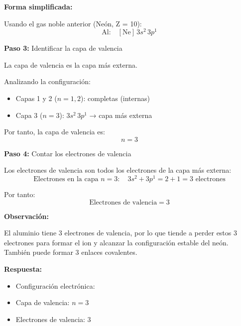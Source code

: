 \begin{exercise}
\begin{solu}
        \textbf{Forma simplificada:}

        Usando el gas noble anterior (Neón, Z = 10):
        \[
            \text{Al:} \quad [\text{Ne}] \, 3s^2 \, 3p^1
        \]

        \textbf{Paso 3:} Identificar la capa de valencia

        La capa de valencia es la capa más externa.

        Analizando la configuración:
        \begin{itemize}
            \item Capas 1 y 2 (\(n = 1, 2\)): completas (internas)
            \item Capa 3 (\(n = 3\)): \(3s^2 \, 3p^1\) → capa más externa
        \end{itemize}

        Por tanto, la capa de valencia es:
        \[
            \boxed{n = 3}
        \]

        \textbf{Paso 4:} Contar los electrones de valencia

        Los electrones de valencia son todos los electrones de la capa más externa:
        \[
            \text{Electrones en la capa } n = 3: \quad 3s^2 + 3p^1 = 2 + 1 = 3 \text{ electrones}
        \]

        Por tanto:
        \[
            \boxed{\text{Electrones de valencia} = 3}
        \]

        \textbf{Observación:}

        El aluminio tiene 3 electrones de valencia, por lo que tiende a perder estos 3 electrones para formar el ion  y alcanzar la configuración estable del neón. También puede formar 3 enlaces covalentes.

        \textbf{Respuesta:}
        \begin{itemize}
            \item Configuración electrónica: 
            \item Capa de valencia: \(n = 3\)
            \item Electrones de valencia: 3
        \end{itemize}
    \end{solu}
\end{exercise}
